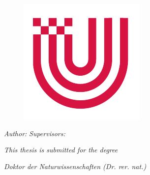 


\begin{titlepage}
  \thispagestyle{empty}

  \begin{center}
    {\large \theUniversity{}}
    \par {\large \theFaculty{}}
    \par {\large \theDepartment{}}


    \begin{figure}[h]
      \centering
      \includegraphics[width=0.35\linewidth]{01_title_page/fig/logo.pdf}
    \end{figure}

    {\huge \textsf{\textbf{\theTitle{}}}}

    \vspace{10mm}

    {\Large \textsf{\textbf{\theThesis{}}}}

    \vspace{15mm}

    \textit{Author:} \hfill \textit{Supervisors:}
    \par {\large \theAuthor{} \hfill \theFirstSupervisor{}}
    \par {\large \hfill \theSecondSupervisor{}}

    \vspace{15mm}

    \textit{This thesis is submitted for the degree}
    \par \textit{Doktor der Naturwissenschaften (Dr. rer. nat.)}

    \vspace{15mm}

    \theDate{}
  \end{center}
\end{titlepage}